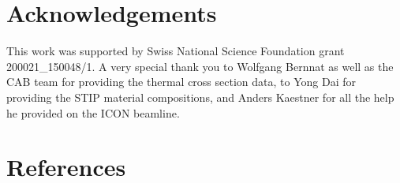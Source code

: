 \documentclass[5p,12pt]{elsarticle}
\begin{document}
%
%
%
%
%

\section*{Acknowledgements}
\label{sec:ack}

This work was supported by Swiss National Science Foundation grant 200021\_150048/1.  A very special thank you to Wolfgang Bernnat as well as the CAB team for providing the thermal cross section data, to Yong Dai for providing the STIP material compositions, and Anders Kaestner for all the help he provided on the ICON beamline.

%
%
%
%
%

\section*{References}


\end{document}

